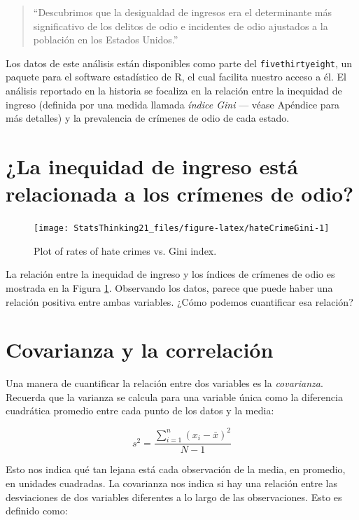 \documentclass[
  12pt,
]{book}
\begin{document}
\begin{quote}
``Descubrimos que la desigualdad de ingresos era el determinante más significativo de los delitos de odio e incidentes de odio ajustados a la población en los Estados Unidos.''
\end{quote}

Los datos de este análisis están disponibles como parte del \texttt{fivethirtyeight}, un paquete para el software estadístico de R, el cual facilita nuestro acceso a él. El análisis reportado en la historia se focaliza en la relación entre la inequidad de ingreso (definida por una medida llamada \emph{índice Gini} --- véase Apéndice para más detalles) y la prevalencia de crímenes de odio de cada estado.

\hypertarget{la-inequidad-de-ingreso-estuxe1-relacionada-a-los-cruxedmenes-de-odio}{%
\section{¿La inequidad de ingreso está relacionada a los crímenes de odio?}\label{la-inequidad-de-ingreso-estuxe1-relacionada-a-los-cruxedmenes-de-odio}}

\begin{figure}
\texttt{[image: StatsThinking21\_files/figure-latex/hateCrimeGini-1]} \caption{Plot of rates of hate crimes vs. Gini index.}\label{fig:hateCrimeGini}
\end{figure}

La relación entre la inequidad de ingreso y los índices de crímenes de odio es mostrada en la Figura \ref{fig:hateCrimeGini}.
Observando los datos, parece que puede haber una relación positiva entre ambas variables. ¿Cómo podemos cuantificar esa relación?

\hypertarget{covariance-and-correlation}{%
\section{Covarianza y la correlación}\label{covariance-and-correlation}}

Una manera de cuantificar la relación entre dos variables es la \emph{covarianza}. Recuerda que la varianza se calcula para una variable única como la diferencia cuadrática promedio entre cada punto de los datos y la media:

\[
s^2 = \frac{\sum_{i=1}^n (x_i - \bar{x})^2}{N - 1}
\]

Esto nos indica qué tan lejana está cada observación de la media, en promedio, en unidades cuadradas. La covarianza nos indica si hay una relación entre las desviaciones de dos variables diferentes a lo largo de las observaciones. Esto es definido como:
\end{document}
